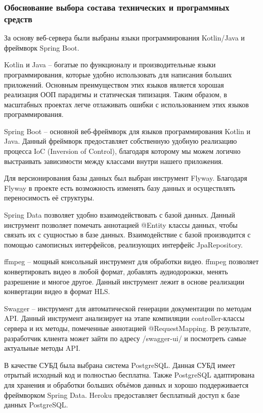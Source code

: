 \documentclass{../includes/TechDoc}
\begin{document}
    \subsubsection{Обоснование выбора состава технических и программных средств}

    За основу веб-сервера были выбраны языки программирования Kotlin/Java и фреймворк Spring Boot.

    Kotlin и Java -- богатые по функционалу и производительные языки программирования, которые удобно использовать для написания больших приложений.
    Основным преимуществом этих языков является хорошая реализация ООП парадигмы и статическая типизация.
    Таким образом, в масштабных проектах легче отлаживать ошибки с использованием этих языков программирования.

    Spring Boot -- основной веб-фреймворк для языков программирования Kotlin и Java.
    Данный фреймворк предоставляет собственную удобную реализацию процесса IoC (Inversion of Control), благодаря которому мы можем логично выстраивать зависимости между классами внутри нашего приложения.

    Для версионирования базы данных был выбран инструмент Flyway.
    Благодаря Flyway в проекте есть возможность изменять базу данных и осуществлять переносимость её структуры.

    Spring Data позволяет удобно взаимодействовать с базой данных.
    Данный инструмент позволяет помечать аннотацией @Entity классы данных, чтобы связать их с сущностью в базе данных.
    Взаимодействие с базой производится с помощью самописных интерфейсов, реализующих интерфейс JpaRepository.

    ffmpeg -- мощный консольный инструмент для обработки видео.
    ffmpeg позволяет конвертировать видео в любой формат, добавлять аудиодорожки, менять разрешение и многое другое.
    Данный инструмент лежит в основе реализации конвертации видео в формат HLS.

    Swagger -- инструмент для автоматической генерации документации по методам API.
    Данный инструмент анализирует на этапе компиляции controller-классы сервера и их методы, помеченные аннотацией @RequestMapping.
    В результате, разработчик клиента может зайти по адресу /swagger-ui/ и посмотреть самые актуальные методы API.

    В качестве СУБД была выбрана система PostgreSQL\@.
    Данная СУБД имеет отрытый исходный код и полностью бесплатна.
    Также PostgreSQL адаптирована для хранения и обработки больших объёмов данных и хорошо поддерживается фреймворком Spring Data.
    Heroku предоставляет бесплатный доступ к базе данных PostgreSQL.
\end{document}
